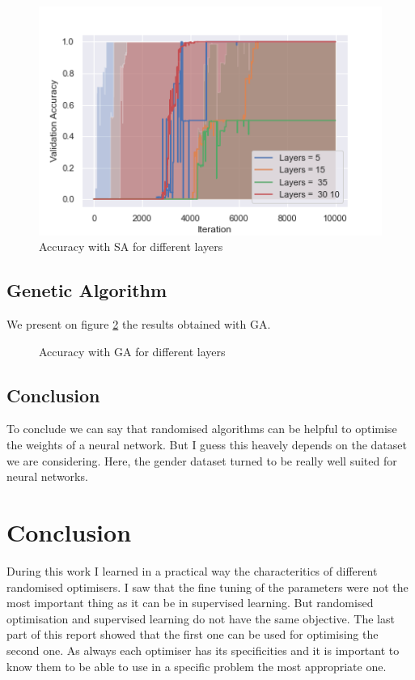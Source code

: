 \documentclass[twocolumn, 10pt]{article}
\begin{document}
			\begin{figure}
				\centering
				\includegraphics[width=0.45\linewidth]{../graphics/g_SA_Iteration_Test_Error_Layers.png}
				\caption{Accuracy with SA for different layers}
				\label{g:sa}
			\end{figure}
		\subsection{Genetic Algorithm}
			We present on figure \ref{g:ga} the results obtained with GA.

			\begin{figure}
				\centering
				\caption{Accuracy with GA for different layers}
				\label{g:ga}
			\end{figure}
		\subsection*{Conclusion}
			To conclude we can say that randomised algorithms can be helpful to optimise the weights of a neural network. But I guess this heavely depends on the dataset we are considering. Here, the gender dataset turned to be really well suited for neural networks.
	\section{Conclusion}
		During this work I learned in a practical way the characteritics of different randomised optimisers. I saw that the fine tuning of the parameters were not the most important thing as it can be in supervised learning. But randomised optimisation and supervised learning do not have the same objective. The last part of this report showed that the first one can be used for optimising the second one. As always each optimiser has its specificities and it is important to know them to be able to use in a specific problem the most appropriate one.
\end{document}
